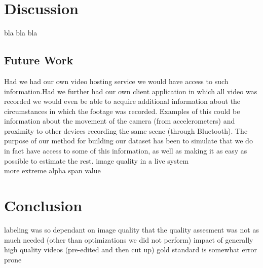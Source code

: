 \chapter{Discussion}
%
bla bla bla
%
\section{Future Work}\label{sec:futurework}
%
Had we had our own video hosting service we would have access to such information.Had we further had our own client application in which all video was recorded we would even be able to acquire additional information about the circumstances in which the footage was recorded. Examples of this could be information about the movement of the camera (from accelerometers) and proximity to other devices recording the same scene (through Bluetooth). The purpose of our method for building our dataset has been to simulate that we do in fact have access to some of this information, as well as making it as easy as possible to estimate the rest.
%
image quality in a live system\\
more extreme alpha span value
%
\chapter{Conclusion}
%
labeling was so dependant on image quality that the quality assesment was not as much needed (other than optimizations we did not perform)
impact of generally high quality videos (pre-edited and then cut up)
gold standard is somewhat error prone
%
